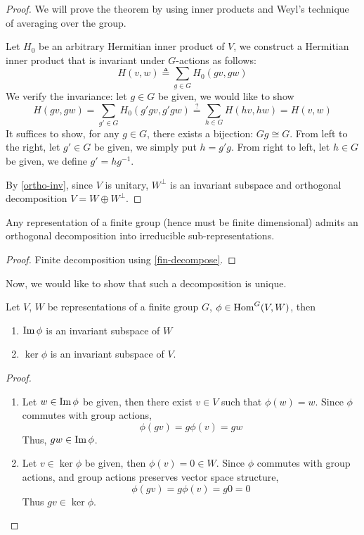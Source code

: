\begin{proof}
  We will prove the theorem by using inner products and Weyl's technique of
  averaging over the group.

  Let $H_0$ be an arbitrary Hermitian inner product of $V$, we construct a
  Hermitian inner product that is invariant under $G$-actions as follows:
  \[
    H(v,w) \triangleq \sum_{g \in G} H_0(gv, gw)
  \]
  We verify the invariance: let $g \in G$ be given, we would like to show
  \[
    H(gv, gw) = \sum_{g' \in G} H_0(g'gv, g'gw) \stackrel{?}{=} \sum_{h \in G}
    H(hv, hw) = H(v,w)
  \]
  It suffices to show, for any $g \in G$, there exists a bijection: $Gg \cong
  G$.  From left to the right, let $g' \in G$ be given, we simply put $h = g'g$.
  From right to left, let $h \in G$ be given, we define $g' = hg^{-1}$.

  By \ref{ortho-inv}, since $V$ is unitary, $W^{\bot}$ is an invariant subspace
  and orthogonal decomposition $V = W \oplus W^{\bot}$.
\end{proof}

\begin{cor}\label{fin-decompose-exist}
  Any representation of a finite group (hence must be finite dimensional) admits
  an orthogonal decomposition into irreducible sub-representations.
\end{cor}

\begin{proof}
  Finite decomposition using \ref{fin-decompose}.
\end{proof}

Now, we would like to show that such a decomposition is unique.

\begin{lem}\label{im-ker-inv}
  Let $V$, $W$ be representations of a finite group $G$, $\phi \in \operatorname{Hom}^G(V,W)$, then
  \begin{enumerate}
    \item
      $\operatorname{Im} \phi$ is an invariant subspace of $W$
    \item
      $\ker \phi$ is an invariant subspace of $V$.
  \end{enumerate}
\end{lem}

\begin{proof}\
  \begin{enumerate}
    \item
      Let $w \in \operatorname{Im} \phi$ be given, then there exist $v \in V$ such that $\phi(w)
      = w$.  Since $\phi$ commutes with group actions,
      \[
        \phi(gv) = g\phi(v) = gw
      \]
      Thus, $gw \in \operatorname{Im} \phi$.

    \item
      Let $v \in \ker \phi$ be given, then $\phi(v) = 0 \in W$. Since $\phi$
      commutes with group actions, and group actions preserves vector space structure,
      \[
        \phi(gv) = g\phi(v) = g0 = 0
      \]
      Thus $gv \in \ker \phi$.
    \end{enumerate}
\end{proof}


